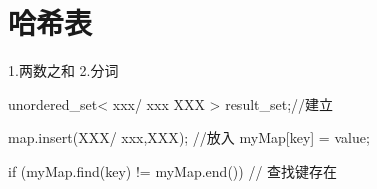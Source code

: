 \chapter{哈希表}
1.两数之和
2.分词


unordered_set< xxx/ xxx XXX > result_set;//建立

map.insert(XXX/ {xxx,XXX}); //放入
myMap[key] = value;

if (myMap.find(key) != myMap.end()) {
    // 查找键存在
}

